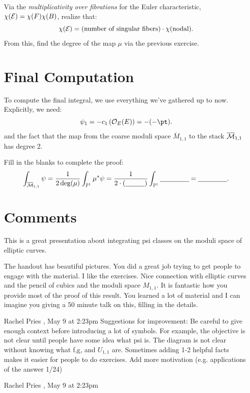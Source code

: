 \documentclass[12pt]{memoir}
\begin{document}
\begin{Ej}
    Via the \emph{multiplicativity over fibrations} for the Euler characteristic, \(\chi(\mathcal{E})=\chi(F)\chi(B)\), realize that:
    \[
        \chi(\mathcal{E})=(\text{number of singular fibers})\cdot\chi(\text{nodal}).
    \]
    From this, find the degree of the map \(\mu\) via the previous exercise.
\end{Ej}

\section{Final Computation}
To compute the final integral, we use everything we've gathered up to now. Explicitly, we need:
\[
    \psi_1=-c_1\left(\cO_E(E)\right)=-(-\pt).
\]
and the fact that the map from the coarse moduli space \(\overline{M}_{1,1}\) to the stack \(\overline{\mathcal{M}}_{1,1}\) has degree 2.

\begin{Ej}
    Fill in the blanks to complete the proof:
    \[
        \int_{\overline{\mathcal{M}}_{1,1}} \psi = \frac{1}{2\deg(\mu)} \int_{\mathbb{P}^1} \mu^* \psi =\frac{1}{2\cdot(\underline{\hspace{1cm}})}\int_{\mathbb{P}^1}\underline{\hspace{1.5cm}}=\underline{\hspace{1.5cm}}.
    \]
\end{Ej}
\vfill
\newpage
\section{Comments}
This is a great presentation about integrating psi classes on the moduli space of elliptic curves.


The handout has beautiful pictures.  You did a great job trying to get people to engage with the material.  I like the exercises.  Nice connection with elliptic curves and the pencil of cubics and the moduli space \(M_{1,1}\).  It is fantastic how you provide most of the proof of this result.  You learned a lot of material and I can imagine you giving a 50 minute talk on this, filling in the details.

Rachel Pries , May 9 at 2:23pm
Suggestions for improvement: Be careful to give enough context before introducing a lot of symbols.  For example, the objective is not clear until people have some idea what psi is.  The diagram is not clear without knowing what f,g, and \(U_{1,1}\) are.   Sometimes adding 1-2 helpful facts makes it easier for people to do exercises.  Add more motivation (e.g. applications of the answer 1/24)

Rachel Pries , May 9 at 2:23pm
\end{document}
